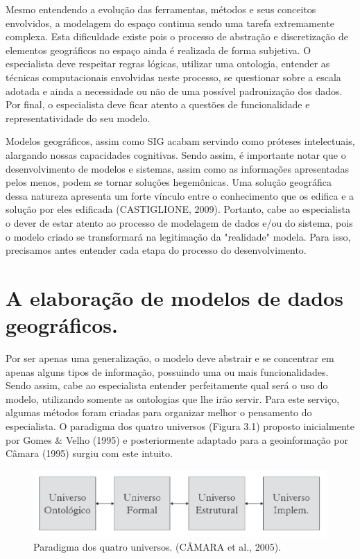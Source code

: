 Mesmo entendendo a evolução das ferramentas, métodos e seus conceitos envolvidos, a modelagem do espaço continua sendo uma tarefa extremamente complexa. Esta dificuldade existe pois o processo de abstração e discretização de elementos geográficos no espaço ainda é realizada de forma subjetiva. O especialista deve respeitar regras lógicas, utilizar uma ontologia, entender as técnicas computacionais envolvidas neste processo, se questionar sobre a escala adotada e ainda a necessidade ou não de uma possível padronização dos dados. Por final, o especialista deve ficar atento a questões de funcionalidade e representatividade do seu modelo.

Modelos geográficos, assim como SIG acabam servindo como próteses intelectuais, alargando nossas capacidades cognitivas. Sendo assim, é importante notar que o desenvolvimento de modelos e sistemas, assim como as informações apresentadas pelos menos, podem se tornar soluções hegemônicas. Uma solução geográfica dessa natureza apresenta um forte vínculo entre o conhecimento que os edifica e a solução por eles edificada (CASTIGLIONE, 2009). Portanto, cabe ao especialista o dever de estar atento ao processo de modelagem de dados e/ou do sistema, pois o modelo criado se transformará na legitimação da "realidade" modela. Para isso, precisamos antes entender cada etapa do processo do desenvolvimento.

\section{A elaboração de modelos de dados geográficos.}

Por ser apenas uma generalização, o modelo deve abstrair e se concentrar em apenas alguns tipos de informação, possuindo uma ou mais funcionalidades. Sendo assim, cabe ao especialista entender perfeitamente qual será o uso do modelo, utilizando somente as ontologias que lhe irão servir.
Para este serviço, algumas métodos foram criadas para organizar melhor o pensamento do especialista. O paradigma dos quatro universos (Figura 3.1) proposto inicialmente por Gomes \& Velho (1995) e posteriormente adaptado para a geoinformação por Câmara (1995) surgiu com este intuito.

	\begin{figure} [h]
		\centering
		\includegraphics[width=1\linewidth]{data/paradigma_quatro_universos}
		\caption{Paradigma dos quatro universos. (CÂMARA et al., 2005).}
		\label{fig:paradigmaquatrouniversos}
	\end{figure} 

